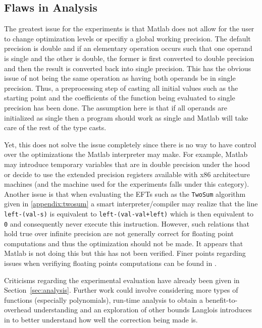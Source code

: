 \documentclass{standalone}
\begin{document}
	\subsection{Flaws in Analysis}
	The greatest issue for the experiments is that Matlab does not allow for the user to change optimization levels or specifiy a global working precision. The default precision is double and if an elementary operation occurs such that one operand is single and the other is double, the former is first converted to double precision and then the result is converted back into single precision. This has the obvious issue of not being the same operation as having both operands be in single precision. Thus, a preprocessing step of casting all initial values such as the starting point and the coefficients of the function being evaluated to single precision has been done. The assumption here is that if all operands are initialized as single then a program should work as single and Matlab will take care of the rest of the type casts.
	\par
	Yet, this does not solve the issue completely since there is no way to have control over the optimizations the Matlab interpreter may make. For example, Matlab may introduce temporary variables that are in double precision under the hood or decide to use the extended precision registers available with x$86$ architecture machines (and the machine used for the experiments falls under this category). Another issue is that when evaluating the EFTs such as the \texttt{TwoSum} algorithm given in \ref{appendix:twosum} a smart interpreter/compiler may realize that the line \texttt{left-(val-s)} is equivalent to \texttt{left-(val-val+left)} which is then equivalent to \texttt{0} and consequently never execute this instruction. However, such relations that hold true over infinite precision are not generally correct for floating point computations and thus the optimization should not be made. It appears that Matlab is not doing this but this has not been verified. Finer points regarding issues when verifiying floating points computations can be found in \cite{monniaux2008pitfalls}.
	\par
	Criticisms regarding the experimental evaluation have already been given in Section~\ref{sec:analysis}. Further work could involve considering more types of functions (especially polynomials), run-time analysis to obtain a benefit-to-overhead understanding and an exploration of other bounds Langlois introduces in \cite{langlois2001automatic} to better understand how well the correction being made is.
\end{document}
